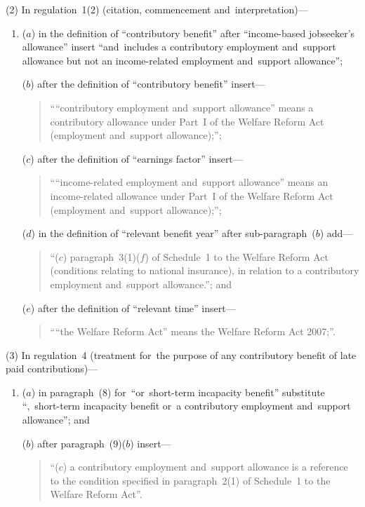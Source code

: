 \documentclass[12pt,a4paper]{article}
\begin{document}
(2) In regulation~1(2) (citation, commencement and~interpretation)—
\begin{enumerate}\item[]
($a$) in the definition of “contributory benefit” after “income-based jobseeker’s allowance” insert “and~includes a contributory employment and~support allowance but not an income-related employment and~support allowance”;

($b$) after the definition of “contributory benefit” insert—
\begin{quotation}
““contributory employment and~support allowance” means a contributory allowance under Part~I of the Welfare Reform Act (employment and~support allowance);”;
\end{quotation}

($c$) after the definition of “earnings factor” insert—
\begin{quotation}\sloppy
““income-related employment and~support allowance” means an income-related allowance under Part~I of the Welfare Reform Act (employment and~support allowance);”;
\end{quotation}

($d$) in the definition of “relevant benefit year” after sub-paragraph~($b$)  add—
\begin{quotation}
“($c$) paragraph~3(1)($f$)  of Schedule~1 to the Welfare Reform Act (conditions relating to national insurance), in relation to a contributory employment and~support allowance.”; and
\end{quotation}

($e$) after the definition of “relevant time” insert—
\begin{quotation}
““the Welfare Reform Act” means the Welfare Reform Act 2007;”.
\end{quotation}
\end{enumerate}

(3) In regulation~4 (treatment for~the purpose of any contributory benefit of late paid contributions)—
\begin{enumerate}\item[]
($a$) in paragraph~(8) for~“or~short-term incapacity benefit” substitute “,~short-term incapacity benefit or~a contributory employment and~support allowance”; and

($b$) after paragraph~(9)($b$)  insert—
\begin{quotation}
“($c$) a contributory employment and~support allowance is a reference to the condition specified in paragraph~2(1) of Schedule~1 to the Welfare Reform Act”.
\end{quotation}
\end{enumerate}
\end{document}
